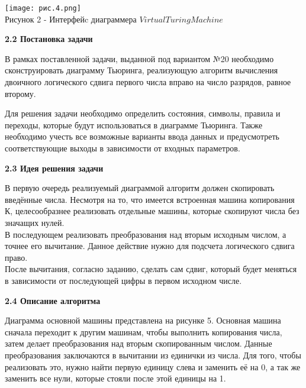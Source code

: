 \documentclass{article}
\begin{document}
\begin{center}
    \texttt{[image: рис.4.png]}\\
    \small{Рисунок 2 -  Интерфейc диаграммера $Virtual Turing Machine$}
    \vspace{0.5cm}
\end{center}

\par \textbf{2.2 Постановка задачи}\\
\par В рамках поставленной задачи, выданной под вариантом №20 необходимо сконструировать диаграмму Тьюринга, реализующую алгоритм вычисления двоичного логического сдвига первого числа вправо на число разрядов, равное второму.\\ 
\par Для решения задачи необходимо определить состояния, символы, правила и переходы, которые будут использоваться в диаграмме Тьюринга. Также необходимо учесть все возможные варианты ввода данных и предусмотреть соответствующие выходы в зависимости от входных параметров.\\

\par \textbf{2.3 Идея решения задачи}\\
\par В первую очередь реализуемый диаграммой алгоритм должен скопировать введённые числа. Несмотря на то, что имеется встроенная машина копирования К, целесообразнее реализовать отдельные машины, которые скопируют числа без значащих нулей. \\
В последующем реализовать преобразования над вторым исходным числом, а точнее его вычитание. Данное действие нужно для подсчета логического сдвига право.\\
После вычитания, согласно заданию, сделать сам сдвиг, который будет меняться в зависимости от последующей цифры в первом исходном числе.\\

\par \textbf{2.4 Описание алгоритма}\\
\par Диаграмма основной машины представлена на рисунке 5. Основная машина сначала переходит к другим машинам, чтобы выполнить копирования числа, затем делает преобразования над вторым скопированным числом. Данные преобразования заключаются в вычитании из единички из числа. Для того, чтобы реализовать это, нужно найти первую единицу слева и заменить её на 0, а так же заменить все нули, которые стояли после этой единицы на 1.
\end{document}
